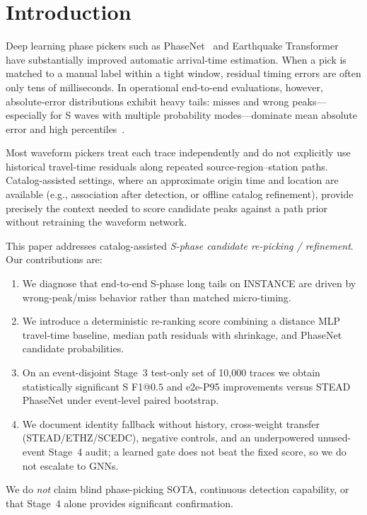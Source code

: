 \section{Introduction}
\label{sec:intro}

Deep learning phase pickers such as PhaseNet~\citep{zhu2019phasenet} and
Earthquake Transformer~\citep{mousavi2020eqt} have substantially improved
automatic arrival-time estimation.
When a pick is matched to a manual label within a tight window, residual timing
errors are often only tens of milliseconds.
In operational end-to-end evaluations, however, absolute-error distributions
exhibit heavy tails: misses and wrong peaks---especially for S waves with
multiple probability modes---dominate mean absolute error and high
percentiles~\citep{munchmeyer2022benchmark}.

Most waveform pickers treat each trace independently and do not explicitly use
historical travel-time residuals along repeated source-region--station paths.
Catalog-assisted settings, where an approximate origin time and location are
available (e.g., association after detection, or offline catalog refinement),
provide precisely the context needed to score candidate peaks against a path
prior without retraining the waveform network.

This paper addresses catalog-assisted \emph{S-phase candidate re-picking /
refinement}.
Our contributions are:
\begin{enumerate}
\item We diagnose that end-to-end S-phase long tails on INSTANCE are driven by
wrong-peak/miss behavior rather than matched micro-timing.
\item We introduce a deterministic re-ranking score combining a distance MLP
travel-time baseline, median path residuals with shrinkage, and PhaseNet
candidate probabilities.
\item On an event-disjoint Stage~3 test-only set of 10{,}000 traces we obtain
statistically significant S F1@$0.5$ and e2e-P95 improvements versus STEAD
PhaseNet under event-level paired bootstrap.
\item We document identity fallback without history, cross-weight transfer
(STEAD/ETHZ/SCEDC), negative controls, and an underpowered unused-event Stage~4
audit; a learned gate does not beat the fixed score, so we do not escalate to
GNNs.
\end{enumerate}

We do \emph{not} claim blind phase-picking SOTA, continuous detection
capability, or that Stage~4 alone provides significant confirmation.
